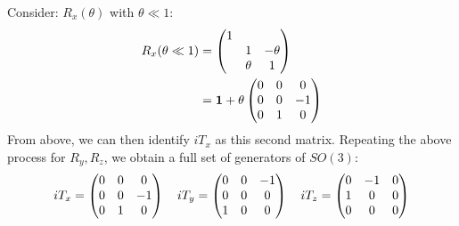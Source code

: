Consider: $R_x(\theta)$ with $\theta\ll 1$:
\begin{align*}
  R_x(\theta\ll1)&=\pmqty{1\\&1&-\theta\\&\theta&1}\\
  &=\bm{1}+\theta\pmqty{0&0&0\\0&0&-1\\0&1&0}
\end{align*}
From above, we can then identify $iT_x$ as this second matrix. Repeating the above process for $R_y,R_z$, we obtain a full set of generators of $SO(3)$:
\begin{align*}
  iT_x=\pmqty{0&0&0\\0&0&-1\\0&1&0}\quad
  iT_y=\pmqty{0&0&-1\\0&0&0\\1&0&0}\quad
  iT_z=\pmqty{0&-1&0\\1&0&0\\0&0&0}
\end{align*}

